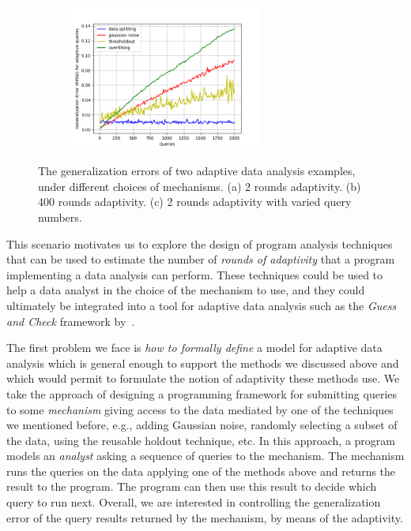 {\begin{figure}
\begin{subfigure}{.322\textwidth}
\begin{centering}
\caption{}
\end{centering}
\end{subfigure}
\begin{subfigure}{.322\textwidth}
\begin{centering}
\includegraphics[width=0.7\textwidth]{twoRounds-rmse-fourmechs.png}
\caption{}
\end{centering}
\end{subfigure}
\vspace{-0.2cm}
 \caption{
 The generalization errors of two adaptive data analysis examples, under different choices of mechanisms.
 (a)  2 rounds adaptivity. 
 (b)  400 rounds adaptivity.
 (c) 2 rounds adaptivity with varied query numbers.
}
\label{fig:generalization_errors}
\vspace{-0.2cm}
\end{figure}
}

This scenario motivates us to explore the design of program analysis techniques that can be used to estimate the number of \emph{rounds of adaptivity} that a program implementing a data analysis can perform. These techniques could be used to help a data analyst in the choice of the mechanism to use,
and they
could ultimately be integrated into a tool for adaptive data analysis such as the \emph{Guess and Check} framework by~\citet{RogersRSSTW20}. 

The first problem we face is \emph{how to formally define} a model for adaptive data analysis which is general enough to support the methods we discussed above and which would permit to formulate the notion of adaptivity these methods use. We take the approach of designing a programming framework for submitting queries to some \emph{mechanism} giving access to the data mediated by one of the techniques we mentioned before, e.g., adding Gaussian noise, randomly selecting a subset of the data, using the reusable holdout technique, etc. In this approach, a program models an \emph{analyst} asking a sequence of queries to the mechanism. The mechanism runs the queries on the data applying one of the methods above and returns the result to the program. The program can then use this result to decide which query to run next. Overall, we are interested in controlling the generalization error of the query results returned by the mechanism, by means of the adaptivity. 

